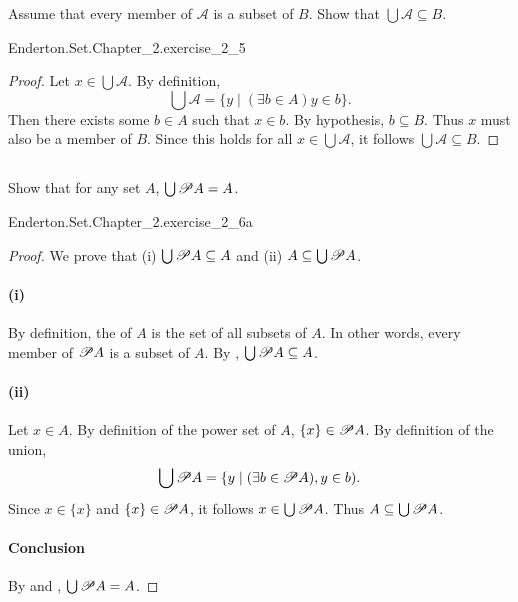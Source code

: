 \documentclass{report}
\begin{document}
  Assume that every member of $\mathscr{A}$ is a subset of $B$.
  Show that $\bigcup \mathscr{A} \subseteq B$.

    {Enderton.Set.Chapter\_2.exercise\_2\_5}

  \begin{proof}
    Let $x \in \bigcup \mathscr{A}$.
    By definition,
      $$\bigcup \mathscr{A} = \{ y \mid (\exists b \in A)y \in b \}.$$
    Then there exists some $b \in A$ such that $x \in b$.
    By hypothesis, $b \subseteq B$.
    Thus $x$ must also be a member of $B$.
    Since this holds for all $x \in \bigcup \mathscr{A}$, it follows
      $\bigcup \mathscr{A} \subseteq B$.
  \end{proof}

\subsection{}%

  Show that for any set $A$, $\bigcup \mathscr{P}A = A$.

    {Enderton.Set.Chapter\_2.exercise\_2\_6a}

  \begin{proof}

    We prove that (i) $\bigcup \mathscr{P}A \subseteq A$ and (ii)
      $A \subseteq \bigcup \mathscr{P}A$.

    \paragraph{(i)}%

      By definition, the  of $A$ is the set of all
        subsets of $A$.
      In other words, every member of $\mathscr{P}A$ is a subset of $A$.
      By , $\bigcup \mathscr{P}A \subseteq A$.

    \paragraph{(ii)}%

      Let $x \in A$.
      By definition of the power set of $A$, $\{x\} \in \mathscr{P}A$. 
      By definition of the union,
        $$\bigcup \mathscr{P}A =
          \{ y \mid (\exists b \in \mathscr{P}A), y \in b).$$
      Since $x \in \{x\}$ and $\{x\} \in \mathscr{P}A$, it follows
        $x \in \bigcup \mathscr{P}A$.
      Thus $A \subseteq \bigcup \mathscr{P}A$.

    \paragraph{Conclusion}%

      By  and ,
        $\bigcup \mathscr{P}A = A$.

  \end{proof}
\end{document}
